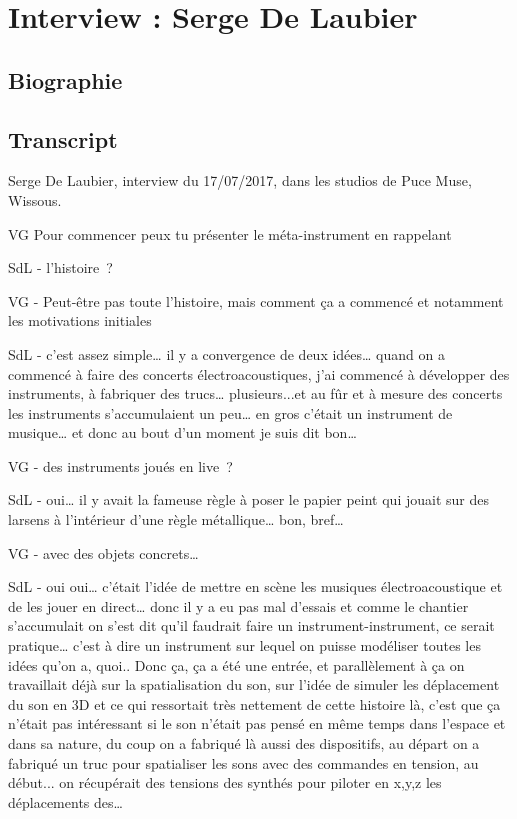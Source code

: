 \chapter{Interview : Serge De Laubier}
\label{appendix:delaubier}
\section*{Biographie}

\section*{Transcript}
Serge De Laubier, interview du 17/07/2017, dans les studios de Puce Muse, Wissous.

VG Pour commencer peux tu présenter le méta-instrument en rappelant 

SdL - l'histoire ? 

VG - Peut-être pas toute l'histoire, mais comment ça a commencé et notamment les motivations initiales 

SdL - c'est assez simple… il y a convergence de deux idées… quand on a commencé à faire des concerts électroacoustiques, j'ai commencé à développer des instruments, à fabriquer des trucs… plusieurs...et au fûr et à mesure des concerts les instruments s'accumulaient un peu… en gros c'était un instrument de musique… et donc au bout d'un moment je suis dit bon… 

VG - des instruments joués en live ? 

SdL - oui… il y avait la fameuse règle à poser le papier peint qui jouait sur des larsens à l'intérieur d'une règle métallique… bon, bref…  

VG - avec des objets concrets… 

SdL - oui oui… c'était l'idée de mettre en scène les musiques électroacoustique et de les jouer en direct… donc il y a eu pas mal d'essais et comme le chantier s'accumulait on s'est dit qu'il faudrait faire un instrument-instrument, ce serait pratique… c'est à dire un instrument sur lequel on puisse modéliser toutes les idées qu'on a, quoi.. Donc ça, ça a été une entrée, et parallèlement à ça on travaillait déjà sur la spatialisation du son, sur l'idée de simuler les déplacement du son en 3D et ce qui ressortait très nettement de cette histoire là, c'est que ça n'était pas intéressant si le son n'était pas pensé en même temps dans l'espace et dans sa nature, du coup on a fabriqué là aussi des dispositifs, au départ on a fabriqué un truc pour spatialiser les sons avec des commandes en tension, au début... on récupérait des tensions des synthés pour piloter en x,y,z les déplacements des… 

